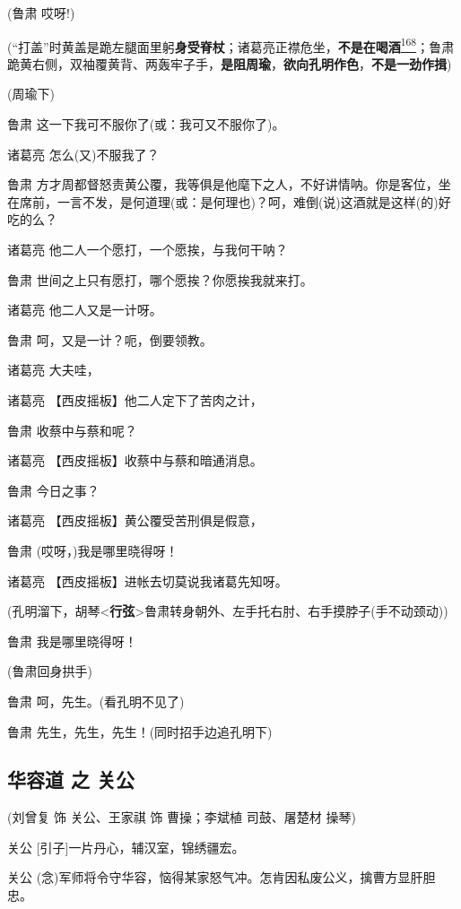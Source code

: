 (鲁肃 哎呀!)

(``打盖''时黄盖是跪左腿面里躬\textbf{身受脊杖}；诸葛亮正襟危坐，\textbf{不是在喝酒}\protect\hyperlink{fn168}{\textsuperscript{168}}；鲁肃跪黄右侧，双袖覆黄背、两轰牢子手，\textbf{是阻周瑜}，\textbf{欲向孔明作色}，\textbf{不是一劲作揖})

(周瑜下)

鲁肃 这一下我可不服你了(或：我可又不服你了)。

诸葛亮 怎么(又)不服我了？

鲁肃
方才周都督怒责黄公覆，我等俱是他麾下之人，不好讲情呐。你是客位，坐在席前，一言不发，是何道理(或：是何理也)？呵，难倒(说)这酒就是这样(的)好吃的么？

诸葛亮 他二人一个愿打，一个愿挨，与我何干呐？

鲁肃 世间之上只有愿打，哪个愿挨？你愿挨我就来打。

诸葛亮 他二人又是一计呀。

鲁肃 呵，又是一计？呃，倒要领教。

诸葛亮 大夫哇，

诸葛亮 【西皮摇板】他二人定下了苦肉之计，

鲁肃 收蔡中与蔡和呢？

诸葛亮 【西皮摇板】收蔡中与蔡和暗通消息。

鲁肃 今日之事？

诸葛亮 【西皮摇板】黄公覆受苦刑俱是假意，

鲁肃 (哎呀，)我是哪里晓得呀！

诸葛亮 【西皮摇板】进帐去切莫说我诸葛先知呀。

(孔明溜下，胡琴\textless{}\textbf{行弦}\textgreater{}鲁肃转身朝外、左手托右肘、右手摸脖子(手不动颈动))

鲁肃 我是哪里晓得呀！

(鲁肃回身拱手)

鲁肃 呵，先生。(看孔明不见了)

鲁肃 先生，先生，先生！(同时招手边追孔明下)

\newpage
\hypertarget{ux534eux5bb9ux9053-ux4e4b-ux5173ux516c}{%
\subsection{华容道 之
关公}\label{ux534eux5bb9ux9053-ux4e4b-ux5173ux516c}}

(刘曾复 饰 关公、王家祺 饰 曹操；李斌植 司鼓、屠楚材 操琴)

关公 {[}引子{]}一片丹心，辅汉室，锦绣疆宏。

关公
(念)军师将令守华容，恼得某家怒气冲。怎肯因私废公义，擒曹方显肝胆忠。

